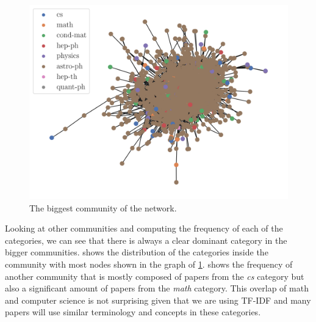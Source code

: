 \begin{figure}[H]
	\includegraphics{figures/community.png}
	\caption{The biggest community of the network.}%
	\label{fig:big_community}
\end{figure}

Looking at other communities and computing the frequency of each of the categories,
we can see that there is always a clear dominant category in the
bigger communities.  shows
the distribution of the categories inside the community with most nodes shown in
the graph of \cref{fig:big_community}.  shows the frequency of
another community that is mostly composed of papers from the \emph{cs} category but also
a significant amount of papers from the \emph{math} category. This overlap of math and computer
science is not surprising given that we are using TF-IDF and many papers will use similar
terminology and concepts in these categories.

